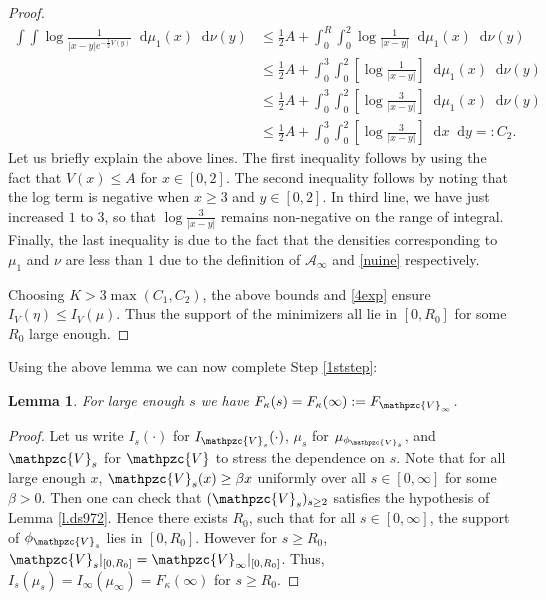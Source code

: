 \documentclass[reqno,11pt]{amsart}
\numberwithin{equation}{section}
\newtheorem{lemma}[proposition]{Lemma}
\theoremstyle{definition}
\newcommand*\diff{\mathop{}\!\mathrm{d}}
\begin{document}
\begin{proof}
\begin{align*}
  \int\int \log \frac{1}{|x-y|e^{-\frac12V(y)}}\diff \mu_1(x)\diff\nu(y) &   \le \frac12A+\int_0^R \int_0^2 \log\frac{1}{|x-y|}\diff\mu_1(x)\diff \nu(y) \\ & \le \frac12A+\int_0^3 \int_0^2 \left[\log\frac{1}{|x-y|}\right]\diff \mu_1(x)\diff \nu(y) \\ & \le \frac12A+\int_0^3 \int_0^2 \left[\log\frac{3}{|x-y|}\right]\diff \mu_1(x)\diff \nu(y) \\ & \le \frac12A+\int_0^3 \int_0^2 \left[\log\frac{3}{|x-y|}\right]\diff x\diff y  =:C_2. 
\end{align*}
Let us briefly explain the above lines. The first inequality follows by using the fact that $V(x)\le A$ for $x\in [0,2]$. The second inequality follows by noting that the log term is negative when $x \ge 3$ and $y\in [0,2]$. In third line, we have just increased $1$ to $3$, so that $\log \frac{3}{|x-y|}$ remains non-negative on the range of integral. Finally, the last inequality is due to the fact that the densities corresponding to $\mu_1$ and $\nu$ are less than $1$ due to the definition of $\mathcal{A}_{\infty}$ and \eqref{nuine} respectively.


Choosing $K>3\max(C_1,C_2)$, the above bounds and \eqref{4exp} ensure $I_V(\eta)\le I_V(\mu)$. Thus the support of the minimizers all lie in $[0,R_0]$ for some $R_0$ large enough. 
\end{proof}

Using the above lemma we can now complete Step \ref{1ststep}:
\begin{lemma} \label{l.energystab} For large enough $s$ we have 
    $F_\kappa(s)=F_\kappa(\infty):=F_{\mathpzc{V}_\infty}$.
\end{lemma}
\begin{proof} Let us write $I_{s}(\cdot)$ for $I_{\mathpzc{V}_s}(\cdot)$, $\mu_s$ for $\mu_{\phi_{\mathpzc{V}_s}}$, and $\mathpzc{V}_s$ for $\mathpzc{V}$ to stress the dependence on $s$.  Note that for all large enough $x$, $\mathpzc{V}_{s}(x) \ge \beta x$ uniformly over all $s\in [0,\infty]$ for some $\beta>0$. Then one can check that $(\mathpzc{V}_s)_{s\ge 2}$ satisfies the hypothesis of Lemma \ref{l.ds972}. Hence there exists $R_0$, such that for all $s\in [0,\infty]$, the support of $\phi_{\mathpzc{V}_s}$ lies in $[0,R_0]$. However for $s\ge R_0$, $\mathpzc{V}_s|_{[0,R_0]}=\mathpzc{V}_{\infty}|_{[0,R_0]}$. Thus, $I_s(\mu_s)=I_{\infty}(\mu_{\infty})=F_\kappa({\infty})$ for $s\ge R_0$. 
\end{proof}
\end{document}
